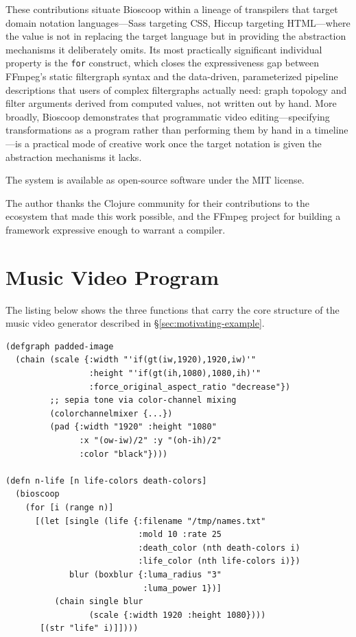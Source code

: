 \documentclass[english,submission]{programming}
\begin{document}
These contributions situate Bioscoop within a lineage of transpilers that target domain notation languages---Sass targeting CSS, Hiccup targeting HTML---where the value is not in replacing the target language but in providing the abstraction mechanisms it deliberately omits. Its most practically significant individual property is the \texttt{for} construct, which closes the expressiveness gap between FFmpeg's static filtergraph syntax and the data-driven, parameterized pipeline descriptions that users of complex filtergraphs actually need: graph topology and filter arguments derived from computed values, not written out by hand. More broadly, Bioscoop demonstrates that programmatic video editing---specifying transformations as a program rather than performing them by hand in a timeline---is a practical mode of creative work once the target notation is given the abstraction mechanisms it lacks.

The system is available as open-source software under the MIT license.

\acks
The author thanks the Clojure community for their contributions to the ecosystem that made this work possible, and the FFmpeg project for building a framework expressive enough to warrant a compiler.

\appendix
\section{Music Video Program}\label{sec:music-video-code}

The listing below shows the three functions that carry the core structure of the music video generator described in \S\ref{sec:motivating-example}.

\begin{lstlisting}[caption={Music video generator in Bioscoop (excerpt)}]
(defgraph padded-image
  (chain (scale {:width "'if(gt(iw,1920),1920,iw)'"
                 :height "'if(gt(ih,1080),1080,ih)'"
                 :force_original_aspect_ratio "decrease"})
         ;; sepia tone via color-channel mixing
         (colorchannelmixer {...})
         (pad {:width "1920" :height "1080"
               :x "(ow-iw)/2" :y "(oh-ih)/2"
               :color "black"})))

(defn n-life [n life-colors death-colors]
  (bioscoop
    (for [i (range n)]
      [(let [single (life {:filename "/tmp/names.txt"
                           :mold 10 :rate 25
                           :death_color (nth death-colors i)
                           :life_color (nth life-colors i)})
             blur (boxblur {:luma_radius "3"
                            :luma_power 1})]
          (chain single blur
                 (scale {:width 1920 :height 1080})))
       [(str "life" i)]])))
\end{lstlisting}
\end{document}

